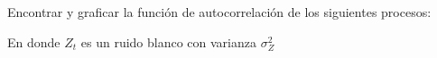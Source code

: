 

\addpoints
\question[50] Encontrar y graficar la función de autocorrelación de los siguientes procesos:
\noaddpoints
{}
En donde $Z_t$ es un ruido blanco con varianza $\sigma_{Z}^{2}$


